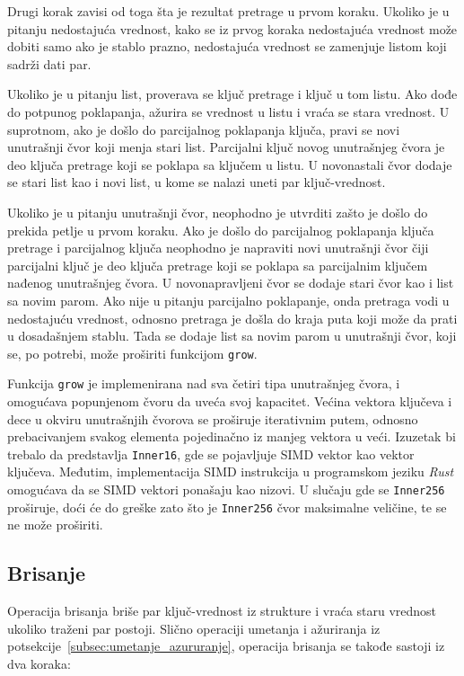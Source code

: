 \documentclass[12pt,oneside]{memoir}
\begin{document}
Drugi korak zavisi od toga šta je rezultat pretrage u prvom koraku.
Ukoliko je u pitanju nedostajuća vrednost, kako se iz prvog koraka
nedostajuća vrednost može dobiti samo ako je stablo prazno,
nedostajuća vrednost se zamenjuje listom koji sadrži dati par.

Ukoliko je u pitanju list, proverava se ključ pretrage i ključ u tom listu.
Ako dođe do potpunog poklapanja, ažurira se
vrednost u listu i vraća se stara vrednost.
U suprotnom, ako je došlo do parcijalnog poklapanja ključa,
pravi se novi unutrašnji čvor koji menja
stari list. Parcijalni ključ novog unutrašnjeg čvora
je deo ključa pretrage koji se poklapa sa ključem u listu.
U novonastali čvor dodaje se stari list kao i novi list,
u kome se nalazi uneti par ključ-vrednost.

Ukoliko je u pitanju unutrašnji čvor, neophodno je utvrditi zašto je došlo
do prekida petlje u prvom koraku. Ako je došlo do parcijalnog poklapanja
ključa pretrage i parcijalnog ključa
neophodno je napraviti novi unutrašnji čvor čiji parcijalni ključ
je deo ključa pretrage koji se poklapa sa
parcijalnim ključem nađenog unutrašnjeg čvora.
U novonapravljeni čvor se dodaje stari čvor kao i list sa novim parom.
Ako nije u pitanju parcijalno poklapanje, onda pretraga vodi u nedostajuću
vrednost, odnosno pretraga je došla do kraja puta koji može da prati u
dosadašnjem stablu.
Tada se dodaje list sa novim parom u unutrašnji
čvor, koji se, po potrebi, može proširiti funkcijom \texttt{grow}.

Funkcija \texttt{grow} je implemenirana nad sva četiri
tipa unutrašnjeg čvora, i omogućava popunjenom čvoru
da uveća svoj kapacitet. Većina vektora ključeva i dece
u okviru unutrašnjih čvorova
se proširuje iterativnim putem, odnosno prebacivanjem svakog
elementa pojedinačno iz manjeg vektora u veći.
Izuzetak bi trebalo da predstavlja \texttt{Inner16},
gde se pojavljuje SIMD vektor kao vektor ključeva.
Međutim, implementacija SIMD instrukcija u programskom jeziku \textit{Rust}
omogućava da se SIMD vektori ponašaju kao nizovi.
U slučaju gde se \texttt{Inner256} proširuje,
doći će do greške zato što je \texttt{Inner256}
čvor maksimalne veličine, te se ne može proširiti.

\subsection{Brisanje}
Operacija brisanja briše par ključ-vrednost iz strukture
i vraća staru vrednost ukoliko traženi par postoji.
Slično operaciji umetanja i ažuriranja iz
potsekcije~\ref{subsec:umetanje_azururanje}, operacija brisanja se
takođe sastoji iz dva koraka:
\end{document}
